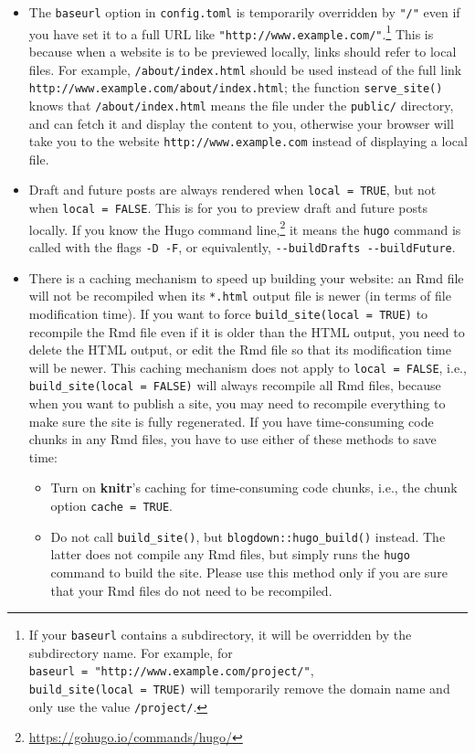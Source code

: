 \documentclass[12pt,]{krantz}
\renewcommand{\href}[2]{#2\footnote{\url{#1}}}
\theoremstyle{definition}
\theoremstyle{definition}
\theoremstyle{definition}
\theoremstyle{remark}
\begin{document}
\begin{itemize}
\item
  The \texttt{baseurl} option in \texttt{config.toml} is temporarily
  overridden by \texttt{"/"} even if you have set it to a full URL like
  \texttt{"http://www.example.com/"}.\footnote{If your \texttt{baseurl}
    contains a subdirectory, it will be overridden by the subdirectory
    name. For example, for
    \texttt{baseurl\ =\ "http://www.example.com/project/"},
    \texttt{build\_site(local\ =\ TRUE)} will temporarily remove the
    domain name and only use the value \texttt{/project/}.} This is
  because when a website is to be previewed locally, links should refer
  to local files. For example, \texttt{/about/index.html} should be used
  instead of the full link
  \texttt{http://www.example.com/about/index.html}; the function
  \texttt{serve\_site()} knows that \texttt{/about/index.html} means the
  file under the \texttt{public/} directory, and can fetch it and
  display the content to you, otherwise your browser will take you to
  the website \texttt{http://www.example.com} instead of displaying a
  local file.
\item
  Draft and future posts are always rendered when
  \texttt{local\ =\ TRUE}, but not when \texttt{local\ =\ FALSE}. This
  is for you to preview draft and future posts locally. If you know the
  \href{https://gohugo.io/commands/hugo/}{Hugo command line,} it means
  the \texttt{hugo} command is called with the flags \texttt{-D\ -F}, or
  equivalently, \texttt{-\/-buildDrafts\ -\/-buildFuture}.
\item
  There is a caching mechanism to speed up building your website: an Rmd
  file will not be recompiled when its \texttt{*.html} output file is
  newer (in terms of file modification time). If you want to force
  \texttt{build\_site(local\ =\ TRUE)} to recompile the Rmd file even if
  it is older than the HTML output, you need to delete the HTML output,
  or edit the Rmd file so that its modification time will be newer. This
  caching mechanism does not apply to \texttt{local\ =\ FALSE}, i.e.,
  \texttt{build\_site(local\ =\ FALSE)} will always recompile all Rmd
  files, because when you want to publish a site, you may need to
  recompile everything to make sure the site is fully regenerated. If
  you have time-consuming code chunks in any Rmd files, you have to use
  either of these methods to save time:

  \begin{itemize}
  \item
    Turn on \textbf{knitr}'s caching for time-consuming code chunks,
    i.e., the chunk option \texttt{cache\ =\ TRUE}.
  \item
    Do not call \texttt{build\_site()}, but
    \texttt{blogdown::hugo\_build()}
    instead. The latter does not compile
    any Rmd files, but simply runs the \texttt{hugo} command to build
    the site. Please use this method only if you are sure that your Rmd
    files do not need to be recompiled.
  \end{itemize}
\end{itemize}
\end{document}
